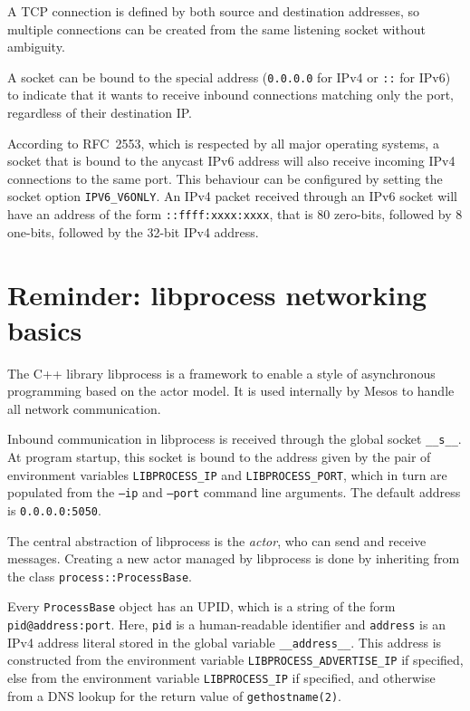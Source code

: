 \documentclass{scrreprt}
\begin{document}
A TCP connection is defined by both source and destination addresses,
so multiple connections can be created from the same listening socket
without ambiguity.

A socket can be bound to the special address (\texttt{0.0.0.0} for IPv4
or \texttt{::} for IPv6) to indicate that it wants to receive inbound connections
matching only the port, regardless of their destination IP.

According to RFC~2553, which is respected by all major operating systems, a socket that
is bound to the anycast IPv6 address will also receive incoming IPv4 connections to
the same port. This behaviour can be configured by setting the socket option \texttt{IPV6\_V6ONLY}.
An IPv4 packet received through an IPv6 socket will have an address of the form \texttt{::ffff:xxxx:xxxx},
that is 80 zero-bits, followed by 8 one-bits, followed by the 32-bit IPv4 address.



\section{Reminder: libprocess networking basics}
The C++ library libprocess is a framework to enable a style of asynchronous
programming based on the actor model. It is used internally by Mesos to
handle all network communication.

Inbound communication in libprocess is received through the global
socket \texttt{\_\_s\_\_}.
At program startup, this socket is bound to the address given by the
pair of environment variables \texttt{LIBPROCESS\_IP} and  \texttt{LIBPROCESS\_PORT},
which in turn are populated from the \texttt{--ip} and \texttt{--port} command line arguments.
The default address is \texttt{0.0.0.0:5050}.

The central abstraction of libprocess is the \emph{actor}, who can send and receive messages.
Creating a new actor managed by libprocess is done by inheriting from the
class \texttt{process::ProcessBase}.

Every \texttt{ProcessBase} object has an UPID, which is a string of the
form \texttt{pid@address:port}.
Here, \texttt{pid} is a human-readable identifier and \texttt{address} is an IPv4 address
literal stored in the  global variable \texttt{\_\_address\_\_}. This address is constructed
from the environment variable \texttt{LIBPROCESS\_ADVERTISE\_IP} if specified, else from
the environment variable \texttt{LIBPROCESS\_IP} if specified, and otherwise from a
DNS lookup for the return value of \texttt{gethostname(2)}.
\end{document}
